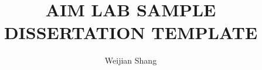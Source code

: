 \documentclass[12pt,letterpaper, oneside,final]{thesisClass}
\begin{document}
\title{AIM LAB SAMPLE DISSERTATION TEMPLATE}
\author{Weijian Shang}
\dissertation
\doctorphilosophy
\copyrightnotice






\begin{spacing}{1}
\def\dsp{\def\baselinestretch{1.25}\large\normalsize}


\end{spacing}
\end{document}

